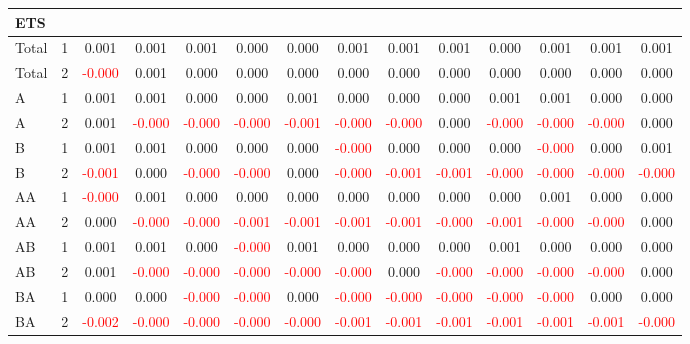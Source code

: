 \begin{table}[!htb]
{\begin{tabular}{llcccccccccccc}
\hline
ETS &  &  &  &  &  &  &  &  &  &  &  &  & \\
\hline
Total & 1 & 0.001 & 0.001 & 0.001 & 0.000 & 0.000 & 0.001 & 0.001 & 0.001 & 0.000 & 0.001 & 0.001 & 0.001\\
Total & 2 & \textcolor{red}{-0.000} & 0.001 & 0.000 & 0.000 & 0.000 & 0.000 & 0.000 & 0.000 & 0.000 & 0.000 & 0.000 & 0.000\\
A & 1 & 0.001 & 0.001 & 0.000 & 0.000 & 0.001 & 0.000 & 0.000 & 0.000 & 0.001 & 0.001 & 0.000 & 0.000\\
A & 2 & 0.001 & \textcolor{red}{-0.000} & \textcolor{red}{-0.000} & \textcolor{red}{-0.000} & \textcolor{red}{-0.001} & \textcolor{red}{-0.000} & \textcolor{red}{-0.000} & 0.000 & \textcolor{red}{-0.000} & \textcolor{red}{-0.000} & \textcolor{red}{-0.000} & 0.000\\
B & 1 & 0.001 & 0.001 & 0.000 & 0.000 & 0.000 & \textcolor{red}{-0.000} & 0.000 & 0.000 & 0.000 & \textcolor{red}{-0.000} & 0.000 & 0.001\\
B & 2 & \textcolor{red}{-0.001} & 0.000 & \textcolor{red}{-0.000} & \textcolor{red}{-0.000} & 0.000 & \textcolor{red}{-0.000} & \textcolor{red}{-0.001} & \textcolor{red}{-0.001} & \textcolor{red}{-0.000} & \textcolor{red}{-0.000} & \textcolor{red}{-0.000} & \textcolor{red}{-0.000}\\
AA & 1 & \textcolor{red}{-0.000} & 0.001 & 0.000 & 0.000 & 0.000 & 0.000 & 0.000 & 0.000 & 0.000 & 0.001 & 0.000 & 0.000\\
AA & 2 & 0.000 & \textcolor{red}{-0.000} & \textcolor{red}{-0.000} & \textcolor{red}{-0.001} & \textcolor{red}{-0.001} & \textcolor{red}{-0.001} & \textcolor{red}{-0.001} & \textcolor{red}{-0.000} & \textcolor{red}{-0.001} & \textcolor{red}{-0.000} & \textcolor{red}{-0.000} & 0.000\\
AB & 1 & 0.001 & 0.001 & 0.000 & \textcolor{red}{-0.000} & 0.001 & 0.000 & 0.000 & 0.000 & 0.001 & 0.000 & 0.000 & 0.000\\
AB & 2 & 0.001 & \textcolor{red}{-0.000} & \textcolor{red}{-0.000} & \textcolor{red}{-0.000} & \textcolor{red}{-0.000} & \textcolor{red}{-0.000} & 0.000 & \textcolor{red}{-0.000} & \textcolor{red}{-0.000} & \textcolor{red}{-0.000} & \textcolor{red}{-0.000} & 0.000\\
BA & 1 & 0.000 & 0.000 & \textcolor{red}{-0.000} & \textcolor{red}{-0.000} & 0.000 & \textcolor{red}{-0.000} & \textcolor{red}{-0.000} & \textcolor{red}{-0.000} & \textcolor{red}{-0.000} & \textcolor{red}{-0.000} & 0.000 & 0.000\\
BA & 2 & \textcolor{red}{-0.002} & \textcolor{red}{-0.000} & \textcolor{red}{-0.000} & \textcolor{red}{-0.000} & \textcolor{red}{-0.000} & \textcolor{red}{-0.001} & \textcolor{red}{-0.001} & \textcolor{red}{-0.001} & \textcolor{red}{-0.001} & \textcolor{red}{-0.001} & \textcolor{red}{-0.001} & \textcolor{red}{-0.000}\\

\end{tabular}}
\end{table}
